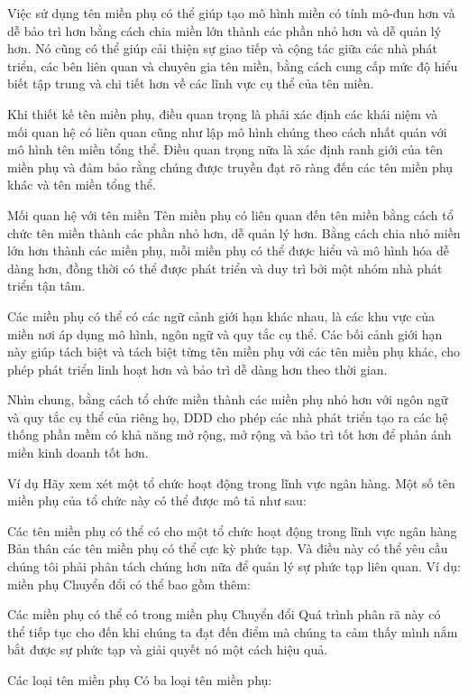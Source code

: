 Việc sử dụng tên miền phụ có thể giúp tạo mô hình miền có tính mô-đun hơn và dễ bảo trì hơn bằng cách chia miền lớn thành các phần nhỏ hơn và dễ quản lý hơn. Nó cũng có thể giúp cải thiện sự giao tiếp và cộng tác giữa các nhà phát triển, các bên liên quan và chuyên gia tên miền, bằng cách cung cấp mức độ hiểu biết tập trung và chi tiết hơn về các lĩnh vực cụ thể của tên miền.

Khi thiết kế tên miền phụ, điều quan trọng là phải xác định các khái niệm và mối quan hệ có liên quan cũng như lập mô hình chúng theo cách nhất quán với mô hình tên miền tổng thể. Điều quan trọng nữa là xác định ranh giới của tên miền phụ và đảm bảo rằng chúng được truyền đạt rõ ràng đến các tên miền phụ khác và tên miền tổng thể.

Mối quan hệ với tên miền
Tên miền phụ có liên quan đến tên miền bằng cách tổ chức tên miền thành các phần nhỏ hơn, dễ quản lý hơn. Bằng cách chia nhỏ miền lớn hơn thành các miền phụ, mỗi miền phụ có thể được hiểu và mô hình hóa dễ dàng hơn, đồng thời có thể được phát triển và duy trì bởi một nhóm nhà phát triển tận tâm.

Các miền phụ có thể có các ngữ cảnh giới hạn khác nhau, là các khu vực của miền nơi áp dụng mô hình, ngôn ngữ và quy tắc cụ thể. Các bối cảnh giới hạn này giúp tách biệt và tách biệt từng tên miền phụ với các tên miền phụ khác, cho phép phát triển linh hoạt hơn và bảo trì dễ dàng hơn theo thời gian.

Nhìn chung, bằng cách tổ chức miền thành các miền phụ nhỏ hơn với ngôn ngữ và quy tắc cụ thể của riêng họ, DDD cho phép các nhà phát triển tạo ra các hệ thống phần mềm có khả năng mở rộng, mở rộng và bảo trì tốt hơn để phản ánh miền kinh doanh tốt hơn.

Ví dụ
Hãy xem xét một tổ chức hoạt động trong lĩnh vực ngân hàng. Một số tên miền phụ của tổ chức này có thể được mô tả như sau:


Các tên miền phụ có thể có cho một tổ chức hoạt động trong lĩnh vực ngân hàng
Bản thân các tên miền phụ có thể cực kỳ phức tạp. Và điều này có thể yêu cầu chúng tôi phải phân tách chúng hơn nữa để quản lý sự phức tạp liên quan. Ví dụ: miền phụ Chuyển đổi có thể bao gồm thêm:


Các miền phụ có thể có trong miền phụ Chuyển đổi
Quá trình phân rã này có thể tiếp tục cho đến khi chúng ta đạt đến điểm mà chúng ta cảm thấy mình nắm bắt được sự phức tạp và giải quyết nó một cách hiệu quả.

Các loại tên miền phụ
Có ba loại tên miền phụ:

